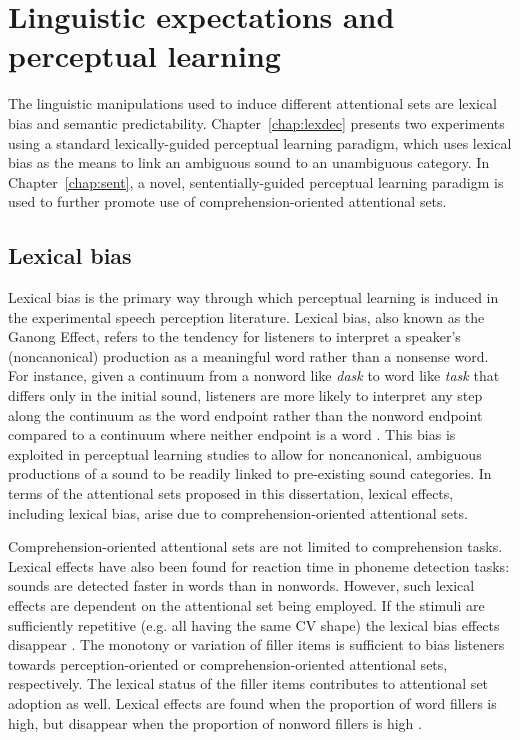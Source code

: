 \section{Linguistic expectations and perceptual learning}
\label{sec:linguistic}

The linguistic manipulations used to induce different attentional sets are lexical bias and semantic predictability.
Chapter~\ref{chap:lexdec} presents two experiments using a standard lexically-guided perceptual learning paradigm, which uses lexical bias as the means to link an ambiguous sound to an unambiguous category.
In Chapter~\ref{chap:sent}, a novel, sententially-guided perceptual learning paradigm is used to further promote use of comprehension-oriented attentional sets.

\subsection{Lexical bias}
\label{sec:lexicalbias}

Lexical bias is the primary way through which perceptual learning is induced in the experimental speech perception literature.
Lexical bias, also known as the Ganong Effect, refers to the tendency for listeners to interpret a speaker's (noncanonical) production as a meaningful word rather than a nonsense word.  
For instance, given a continuum from a nonword like \emph{dask} to word like \emph{task} that differs only in the initial sound, listeners are more likely to interpret any step along the continuum as the word endpoint rather than the nonword endpoint compared to a continuum where neither endpoint is a word \citep{Ganong1980}. 
This bias is exploited in perceptual learning studies to allow for noncanonical, ambiguous productions of a sound to be readily linked to pre-existing sound categories.
In terms of the attentional sets proposed in this dissertation, lexical effects, including lexical bias, arise due to comprehension-oriented attentional sets.

Comprehension-oriented attentional sets are not limited to comprehension tasks.
Lexical effects have also been found for reaction time in phoneme detection tasks:
sounds are detected faster in words than in nonwords.
However, such lexical effects are dependent on the attentional set being employed.  
If the stimuli are sufficiently repetitive (e.g. all having the same CV shape) the lexical bias effects disappear \citep{Cutler1987}.
The monotony or variation of filler items is sufficient to bias listeners towards perception-oriented or comprehension-oriented attentional sets, respectively.
The lexical status of the filler items contributes to attentional set adoption as well.
Lexical effects are found when the proportion of word fillers is high, but disappear when the proportion of nonword fillers is high \citep{Mirman2008}.

